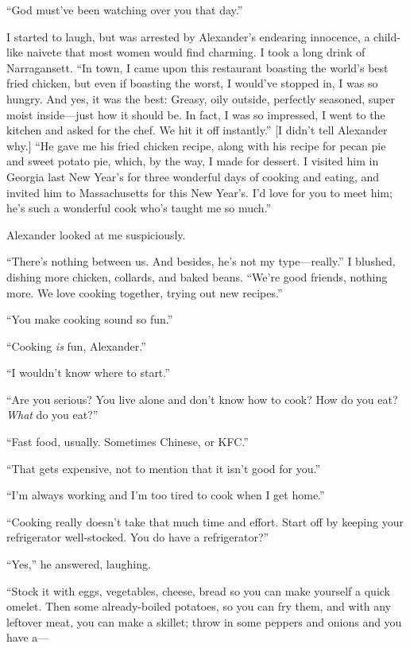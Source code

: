 ``God must've been watching over you that day.''

I started to laugh, but was arrested by Alexander's endearing innocence,
a child-like naivete that most women would find charming. I took a long
drink of Narragansett. ``In town, I came upon this restaurant boasting
the world's best fried chicken, but even if boasting the worst, I
would've stopped in, I was so hungry. And yes, it was the best: Greasy,
oily outside, perfectly seasoned, super moist inside---just how it
should be. In fact, I was so impressed, I went to the kitchen and asked
for the chef. We hit it off instantly.'' {[}I didn't tell Alexander
why.{]} ``He gave me his fried chicken recipe, along with his recipe for
pecan pie and sweet potato pie, which, by the way, I made for dessert. I
visited him in Georgia last New Year's for three wonderful days of
cooking and eating, and invited him to Massachusetts for this New
Year's. I'd love for you to meet him; he's such a wonderful cook who's
taught me so much.''

Alexander looked at me suspiciously.

``There's nothing between us. And besides, he's not my type---really.''
I blushed, dishing more chicken, collards, and baked beans. ``We're good
friends, nothing more. We love cooking together, trying out new
recipes.''

``You make cooking sound so fun.''

``Cooking \emph{is} fun, Alexander.''

``I wouldn't know where to start.''

``Are you serious? You live alone and don't know how to cook? How do you
eat? \emph{What} do you eat?''

``Fast food, usually. Sometimes Chinese, or KFC.''

``That gets expensive, not to mention that it isn't good for you.''

``I'm always working and I'm too tired to cook when I get home.''

``Cooking really doesn't take that much time and effort. Start off by
keeping your refrigerator well-stocked. You do have a refrigerator?''

``Yes,'' he answered, laughing.

``Stock it with eggs, vegetables, cheese, bread so you can make yourself
a quick omelet. Then some already-boiled potatoes, so you can fry them,
and with any leftover meat, you can make a skillet; throw in some
peppers and onions and you have a---

